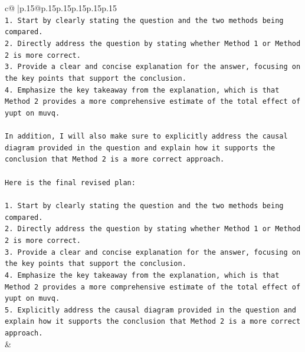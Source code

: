 \documentclass{article}
\begin{document}
{\begin{supertabular}{c@{$\;$}|p{.15\linewidth}@{}p{.15\linewidth}p{.15\linewidth}p{.15\linewidth}p{.15\linewidth}p{.15\linewidth}}
{{{\\ 
\texttt{1. Start by clearly stating the question and the two methods being compared.} \\
\texttt{2. Directly address the question by stating whether Method 1 or Method 2 is more correct.} \\
\texttt{3. Provide a clear and concise explanation for the answer, focusing on the key points that support the conclusion.} \\
\texttt{4. Emphasize the key takeaway from the explanation, which is that Method 2 provides a more comprehensive estimate of the total effect of yupt on muvq.} \\
\\ 
\texttt{In addition, I will also make sure to explicitly address the causal diagram provided in the question and explain how it supports the conclusion that Method 2 is a more correct approach. } \\
\\ 
\texttt{Here is the final revised plan:} \\
\\ 
\texttt{1. Start by clearly stating the question and the two methods being compared.} \\
\texttt{2. Directly address the question by stating whether Method 1 or Method 2 is more correct.} \\
\texttt{3. Provide a clear and concise explanation for the answer, focusing on the key points that support the conclusion.} \\
\texttt{4. Emphasize the key takeaway from the explanation, which is that Method 2 provides a more comprehensive estimate of the total effect of yupt on muvq.} \\
\texttt{5. Explicitly address the causal diagram provided in the question and explain how it supports the conclusion that Method 2 is a more correct approach.} \\
            }
        }
    }
    & \\ \\

\end{supertabular}
}
\end{document}
